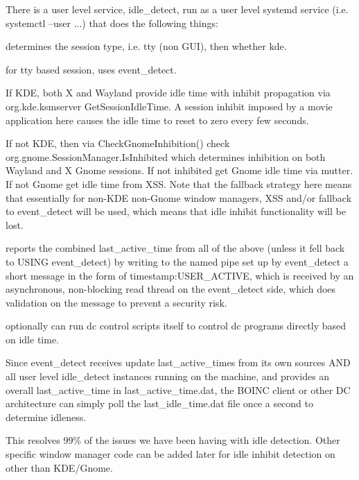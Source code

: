 \begin{DoxyEnumerate}
\item There is a user level service, idle\+\_\+detect, run as a user level systemd service (i.\+e. systemctl --user ...) that does the following things\+:
\begin{DoxyItemize}
\item determines the session type, i.\+e. tty (non G\+UI), then whether kde.
\item for tty based session, uses event\+\_\+detect.
\item If K\+DE, both X and Wayland provide idle time with inhibit propagation via org.\+kde.\+ksmserver Get\+Session\+Idle\+Time. A session inhibit imposed by a movie application here causes the idle time to reset to zero every few seconds.
\item If not K\+DE, then via Check\+Gnome\+Inhibition() check org.\+gnome.\+Session\+Manager.\+Is\+Inhibited which determines inhibition on both Wayland and X Gnome sessions. If not inhibited get Gnome idle time via mutter. If not Gnome get idle time from X\+SS. Note that the fallback strategy here means that essentially for non-\/\+K\+DE non-\/\+Gnome window managers, X\+SS and/or fallback to event\+\_\+detect will be used, which means that idle inhibit functionality will be lost.
\item reports the combined last\+\_\+active\+\_\+time from all of the above (unless it fell back to U\+S\+I\+NG event\+\_\+detect) by writing to the named pipe set up by event\+\_\+detect a short message in the form of timestamp\+:U\+S\+E\+R\+\_\+\+A\+C\+T\+I\+VE, which is received by an asynchronous, non-\/blocking read thread on the event\+\_\+detect side, which does validation on the message to prevent a security risk.
\item optionally can run dc control scripts itself to control dc programs directly based on idle time.
\end{DoxyItemize}
\end{DoxyEnumerate}

Since event\+\_\+detect receives update last\+\_\+active\+\_\+times from its own sources A\+ND all user level idle\+\_\+detect instances running on the machine, and provides an overall last\+\_\+active\+\_\+time in last\+\_\+active\+\_\+time.\+dat, the B\+O\+I\+NC client or other DC architecture can simply poll the last\+\_\+idle\+\_\+time.\+dat file once a second to determine idleness.

This resolves 99\% of the issues we have been having with idle detection. Other specific window manager code can be added later for idle inhibit detection on other than K\+D\+E/\+Gnome.

